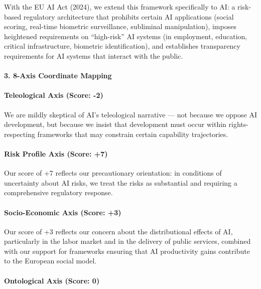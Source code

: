 With the EU AI Act (2024), we extend this framework specifically to AI:
a risk-based regulatory architecture that prohibits certain AI
applications (social scoring, real-time biometric surveillance,
subliminal manipulation), imposes heightened requirements on
``high-risk'' AI systems (in employment, education, critical
infrastructure, biometric identification), and establishes transparency
requirements for AI systems that interact with the public.

\paragraph{3. 8-Axis Coordinate
Mapping}\label{axis-coordinate-mapping-9}

\paragraph{Teleological Axis (Score:
-2)}\label{teleological-axis-score--2}

We are mildly skeptical of AI's teleological narrative --- not because
we oppose AI development, but because we insist that development must
occur within rights-respecting frameworks that may constrain certain
capability trajectories.

\paragraph{Risk Profile Axis (Score:
+7)}\label{risk-profile-axis-score-7-1}

Our score of +7 reflects our precautionary orientation: in conditions of
uncertainty about AI risks, we treat the risks as substantial and
requiring a comprehensive regulatory response.

\paragraph{Socio-Economic Axis (Score:
+3)}\label{socio-economic-axis-score-3-1}

Our score of +3 reflects our concern about the distributional effects of
AI, particularly in the labor market and in the delivery of public
services, combined with our support for frameworks ensuring that AI
productivity gains contribute to the European social model.

\paragraph{Ontological Axis (Score:
0)}\label{ontological-axis-score-0-4}

